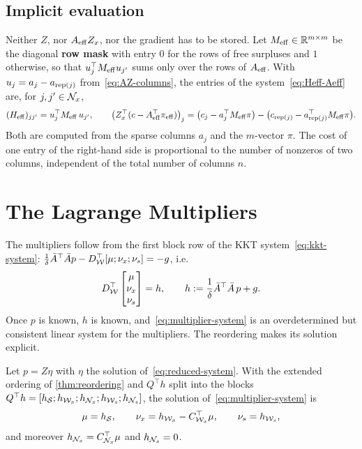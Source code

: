 \subsection{Implicit evaluation}

Neither $Z$, nor $A_{\mathrm{eff}} Z_x$, nor the gradient has to be stored. Let $M_{\mathrm{eff}}\in\mathbb{R}^{m\times m}$
be the diagonal \textbf{row mask} with entry $0$ for the rows of free surpluses and $1$
otherwise, so that $u_j^\top M_{\mathrm{eff}} u_{j'}$ sums only over the rows of $A_{\mathrm{eff}}$. With
$u_j = a_j - a_{\operatorname{rep}(j)}$ from~\eqref{eq:AZ-columns}, the entries of the system~\eqref{eq:Heff-Aeff}
are, for $j, j'\in\mathcal{N}_x$,
\begin{equation} \label{eq:implicit}
(H_{\mathrm{eff}})_{jj'} = u_j^\top M_{\mathrm{eff}}\,u_{j'},\qquad
\bigl(Z_x^\top(c - A_{\mathrm{eff}}^\top\pi_{\mathrm{eff}})\bigr)_j = \bigl(c_j - a_j^\top M_{\mathrm{eff}}\pi\bigr)
- \bigl(c_{\operatorname{rep}(j)} - a_{\operatorname{rep}(j)}^\top M_{\mathrm{eff}}\pi\bigr).
\end{equation}
Both are computed from the sparse columns $a_j$ and the $m$-vector $\pi$. The cost of one entry
of the right-hand side is proportional to the number of nonzeros of two columns, independent
of the total number of columns $n$.


\section{The Lagrange Multipliers}
\label{sec:multipliers}

The multipliers follow from the first block row of the KKT system~\eqref{eq:kkt-system}:
$\frac{1}{\delta}\bar{A}^\top\bar{A} p - D_{\mathcal{W}}^\top[\mu;\nu_x;\nu_s] = -g$, i.e.
\begin{equation} \label{eq:multiplier-system}
D_{\mathcal{W}}^\top\begin{bmatrix}\mu\\ \nu_x\\ \nu_s\end{bmatrix} = h,\qquad
h := \frac{1}{\delta}\bar{A}^\top\bar{A}\,p + g .
\end{equation}
Once $p$ is known, $h$ is known, and~\eqref{eq:multiplier-system} is an overdetermined but
consistent linear system for the multipliers. The reordering makes its solution explicit.

\begin{theorem} \label{thm:multipliers}
Let $p = Z\eta$ with $\eta$ the solution of~\eqref{eq:reduced-system}. With the extended ordering
of \cref{thm:reordering} and $Q^\top h$ split into the blocks
$Q^\top h = [h_{\mathcal{S}}; h_{\mathcal{W}_x}; h_{\mathcal{N}_x}; h_{\mathcal{W}_s}; h_{\mathcal{N}_s}]$, the solution
of~\eqref{eq:multiplier-system} is
\begin{equation} \label{eq:multipliers}
\mu = h_{\mathcal{S}},\qquad \nu_x = h_{\mathcal{W}_x} - C_{\mathcal{W}_x}^\top\mu,\qquad \nu_s = h_{\mathcal{W}_s},
\end{equation}
and moreover $h_{\mathcal{N}_x} = C_{\mathcal{N}_x}^\top\mu$ and $h_{\mathcal{N}_s} = 0$.
\end{theorem}

